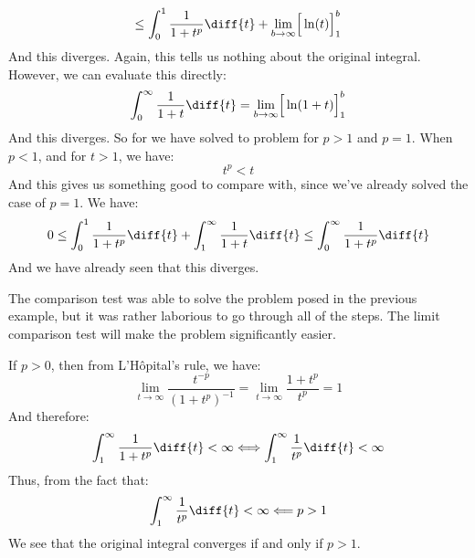 \documentclass[crop=false,class=book,oneside]{standalone}
\begin{document}
\begin{lexample}
\begin{equation}
                \leq\int_{0}^{1}\frac{1}{1+t^{p}}\diff{t}+
                \underset{b\rightarrow\infty}{\lim}
                \Big[\ln(t)\Big]_{1}^{b}
            \end{equation}
            And this diverges. Again, this tells us nothing about
            the original integral. However, we can evaluate this
            directly:
            \begin{equation}
                \int_{0}^{\infty}\frac{1}{1+t}\diff{t}=
                \underset{b\rightarrow\infty}{\lim}
                \Big[\ln(1+t)\Big]_{1}^{b}
            \end{equation}
            And this diverges. So for we have solved to problem
            for $p>1$ and $p=1$. When $p<1$, and for $t>1$, we have:
            \begin{equation}
                t^{p}<t
            \end{equation}
            And this gives us something good to compare with,
            since we've already solved the case of $p=1$. We have:
            \begin{equation}
                0\leq\int_{0}^{1}\frac{1}{1+t^{p}}\diff{t}
                +\int_{1}^{\infty}\frac{1}{1+t}\diff{t}
                \leq\int_{0}^{\infty}\frac{1}{1+t^{p}}\diff{t}
            \end{equation}
            And we have already seen that this diverges.
        \end{lexample}
        The comparison test was able to solve the problem posed in
        the previous example, but it was rather laborious to go
        through all of the steps. The limit comparison test will make
        the problem significantly easier.
        \begin{lexample}
            If $p>0$, then from L'H\^{o}pital's rule, we have:
            \begin{equation}
                \underset{t\rightarrow\infty}{\lim}
                \frac{t^{\minus{p}}}{(1+t^{p})^{\minus{1}}}
                =\underset{t\rightarrow\infty}{\lim}
                    \frac{1+t^{p}}{t^{p}}=1
            \end{equation}
            And therefore:
            \begin{equation}
                \int_{1}^{\infty}\frac{1}{1+t^{p}}\diff{t}<\infty
                \Longleftrightarrow
                \int_{1}^{\infty}\frac{1}{t^{p}}\diff{t}<\infty
            \end{equation}
            Thus, from the fact that:
            \begin{equation}
                \int_{1}^{\infty}\frac{1}{t^{p}}\diff{t}<\infty
                \Longleftarrow
                p>1
            \end{equation}
            We see that the original integral converges if and only
            if $p>1$.
        \end{lexample}
\end{document}
